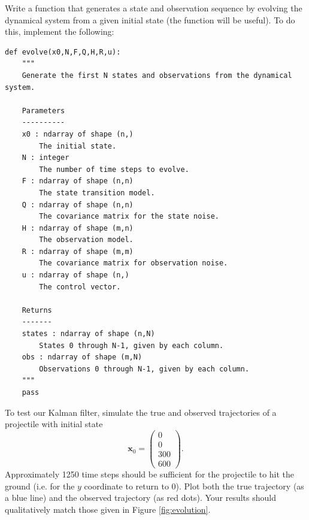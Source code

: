 \begin{problem}
Write a function that generates a state and observation sequence by evolving the dynamical system from a given initial state (the function  will be useful).
To do this, implement the following:
\begin{lstlisting}
def evolve(x0,N,F,Q,H,R,u):
    """
    Generate the first N states and observations from the dynamical system.

    Parameters
    ----------
    x0 : ndarray of shape (n,)
        The initial state.
    N : integer
        The number of time steps to evolve.
    F : ndarray of shape (n,n)
        The state transition model.
    Q : ndarray of shape (n,n)
        The covariance matrix for the state noise.
    H : ndarray of shape (m,n)
        The observation model.
    R : ndarray of shape (m,m)
        The covariance matrix for observation noise.
    u : ndarray of shape (n,)
        The control vector.

    Returns
    -------
    states : ndarray of shape (n,N)
        States 0 through N-1, given by each column.
    obs : ndarray of shape (m,N)
        Observations 0 through N-1, given by each column.
    """
    pass
\end{lstlisting}

\noindent To test our Kalman filter, simulate the true and observed trajectories of a projectile with initial state
\begin{equation*}
    \mathbf{x}_0 = \left( \begin{array}{c} 0\\ 0 \\ 300 \\ 600\end{array} \right).
\end{equation*}
Approximately 1250 time steps should be sufficient for the projectile to hit the ground (i.e. for the $y$ coordinate to return to 0).
Plot both the true trajectory (as a blue line) and the observed trajectory (as red dots).
Your results should qualitatively match those given in Figure \ref{fig:evolution}.
\label{prob:simulation}
\end{problem}


